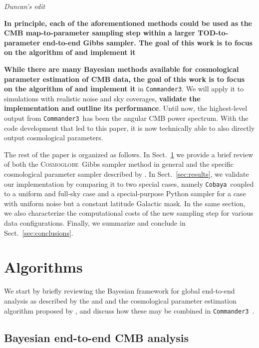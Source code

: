 \documentclass[twocolumn]{aa}
\def\commanderthree{\texttt{Commander3}}
\def\cobaya{\texttt{Cobaya}}
\newcommand{\cosmoglobe}{\textsc{Cosmoglobe}}
\begin{document}
\textit{Duncan's edit}

\textbf{In principle, each of the aforementioned methods could be used as the CMB map-to-parameter sampling step within a larger TOD-to-parameter end-to-end Gibbs sampler. The goal of this work is to focus on the algorithm of \citet{racine:2016} and implement it}

\textbf{While there are many Bayesian methods available for cosmological parameter estimation of CMB data, the goal of this work is to focus on the algorithm of \citet{racine:2016} and implement it} in \commanderthree. We will apply it to simulations with realistic noise and sky coverages, \textbf{validate the implementation and outline its performance}. Until now, the highest-level output from \commanderthree\ has been the angular CMB power spectrum. With the code development that led to this paper, it is now technically able to also directly output cosmological parameters.

The rest of the paper is organized as follows. In Sect.~\ref{sec:methods} we provide a brief review of both the \cosmoglobe\ Gibbs sampler method in general and the specific cosmological parameter sampler described by \citet{racine:2016}. In Sect.~\ref{sec:results}, we validate our implementation by comparing it to two special cases, namely \cobaya\ coupled to a uniform and full-sky case and a special-purpose Python sampler for a case with uniform noise but a constant latitude Galactic mask. In the same section, we also characterize the computational costs of the new sampling step for various data configurations. Finally, we summarize and conclude in Sect.~\ref{sec:conclusions}.

\section{Algorithms}
\label{sec:methods}

We start by briefly reviewing the Bayesian framework for global end-to-end analysis as described by the \citet{bp01} and \citet{watts2023_dr1} and the cosmological parameter estimation algorithm proposed by \citet{racine:2016}, and discuss how these may be combined in \commanderthree\ \citep{bp03}.

\subsection{Bayesian end-to-end CMB analysis}
\end{document}
